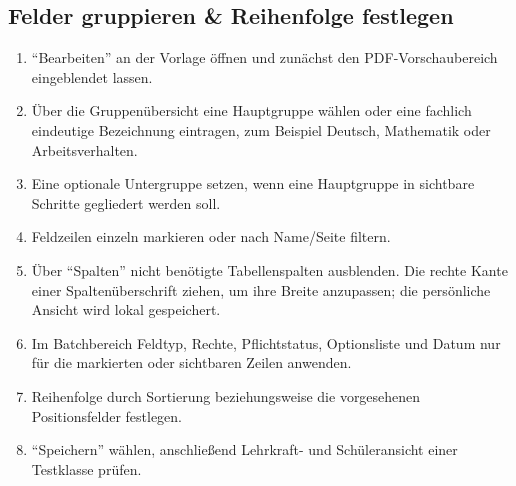 \documentclass[12pt,a4paper]{article}
\begin{document}
\subsection{Felder gruppieren \& Reihenfolge festlegen}\label{sec:felder-gruppieren}
\begin{enumerate}
  \item \enquote{Bearbeiten} an der Vorlage öffnen und zunächst den PDF-Vorschaubereich eingeblendet lassen.
  \item Über die Gruppenübersicht eine Hauptgruppe wählen oder eine fachlich eindeutige Bezeichnung eintragen, zum Beispiel Deutsch, Mathematik oder Arbeitsverhalten.
  \item Eine optionale Untergruppe setzen, wenn eine Hauptgruppe in sichtbare Schritte gegliedert werden soll.
  \item Feldzeilen einzeln markieren oder nach Name/Seite filtern.
  \item Über \enquote{Spalten} nicht benötigte Tabellenspalten ausblenden. Die rechte Kante einer Spaltenüberschrift ziehen, um ihre Breite anzupassen; die persönliche Ansicht wird lokal gespeichert.
  \item Im Batchbereich Feldtyp, Rechte, Pflichtstatus, Optionsliste und Datum nur für die markierten oder sichtbaren Zeilen anwenden.
  \item Reihenfolge durch Sortierung beziehungsweise die vorgesehenen Positionsfelder festlegen.
  \item \enquote{Speichern} wählen, anschließend Lehrkraft- und Schüleransicht einer Testklasse prüfen.
\end{enumerate}
\end{document}
